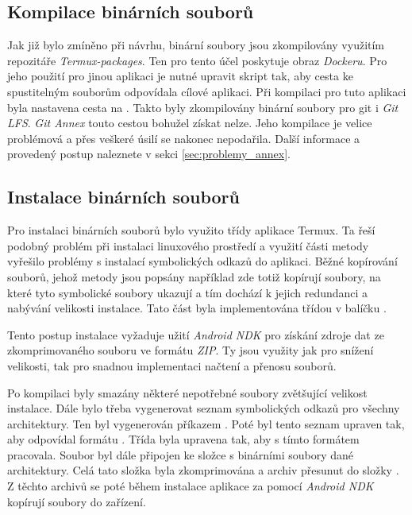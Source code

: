 \subsection{Kompilace binárních souborů}
Jak již bylo zmíněno při návrhu, binární soubory jsou zkompilovány využitím repozitáře \emph{Termux-packages}. Ten pro tento účel poskytuje obraz \emph{Dockeru}. Pro jeho použití pro jinou aplikaci je nutné upravit skript  tak, aby cesta ke spustitelným souborům odpovídala cílové aplikaci. Při kompilaci pro tuto aplikaci byla nastavena cesta  na . Takto byly zkompilovány binární soubory pro git i \emph{Git LFS}. \emph{Git Annex} touto cestou bohužel získat nelze. Jeho kompilace je velice problémová a přes veškeré úsilí se nakonec nepodařila. Další informace a provedený postup naleznete v sekci \ref{sec:problemy_annex}.

\subsection{Instalace binárních souborů}
Pro instalaci binárních souborů bylo využito třídy  aplikace Termux. Ta řeší podobný problém při instalaci linuxového prostředí a využití části metody  vyřešilo problémy s instalací symbolických odkazů do aplikaci. Běžné kopírování souborů, jehož metody jsou popsány například zde  totiž kopírují soubory, na které tyto symbolické soubory ukazují a tím dochází k jejich redundanci a nabývání velikosti instalace. Tato část byla implementována třídou  v balíčku .

Tento postup instalace vyžaduje užití \emph{Android NDK} pro získání zdroje dat ze zkomprimovaného souboru ve formátu \emph{ZIP}. Ty jsou využity jak pro snížení velikosti, tak pro snadnou implementaci načtení a přenosu souborů.

Po kompilaci byly smazány některé nepotřebné soubory zvětšující velikost instalace. Dále bylo třeba vygenerovat seznam symbolických odkazů pro všechny architektury. Ten byl vygenerován příkazem . Poté byl tento seznam upraven tak, aby odpovídal formátu . Třída  byla upravena tak, aby s tímto formátem pracovala. Soubor  byl dále připojen ke složce s binárními soubory dané architektury. Celá tato složka byla zkomprimována a archiv přesunut do složky . Z těchto archivů se poté během instalace aplikace za pomocí \emph{Android NDK} kopírují soubory do zařízení.

